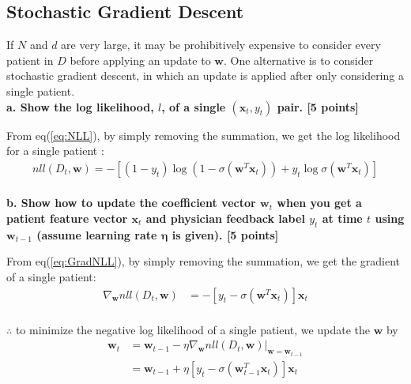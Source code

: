 \documentclass[12pt]{article}
\begin{document}
\subsection{Stochastic Gradient Descent}
If $N$ and $d$ are very large, it may be prohibitively expensive to consider every patient in $D$ before applying an update to $\mathbf{w}$. One alternative is to consider stochastic gradient descent, in which an update is applied after only considering a single patient. \\

\textbf{a. Show the log likelihood, $l$, of a single $(\mathbf{x}_t, y_t)$ pair. [5 points]}

From eq(\ref{eq:NLL}), by simply removing the summation, we get the log likelihood for a single patient :
\begin{equation}
\begin{aligned}
nll\left (D_t, \mathbf{w} \right ) = - \left [ \left ( 1 - y_t \right ) \log(1-\sigma(\mathbf{w}^T\mathbf{x}_t)) + y_t\log \sigma(\mathbf{w}^T\mathbf{x}_t)  \right ]
\end{aligned}
\label{eq:nll}
\end{equation}\\

\textbf{b. Show how to update the coefficient vector $\mathbf{w}_t$ when you get a patient feature vector $\mathbf{x}_t$ and physician feedback label $y_t$ at time $t$ using $\mathbf{w}_{t-1}$ (assume learning rate $\mathbf{\eta}$ is given). [5 points]}

From eq(\ref{eq:GradNLL}), by simply removing the summation, we get the gradient of a single patient:
\begin{equation}
\begin{aligned}
\nabla_\mathbf{w}nll\left (D_t, \mathbf{w} \right ) 
& = - \left [ 
y_t - \sigma(\mathbf{w}^T\mathbf{x}_t)
\right ]\mathbf{x}_t\\
\end{aligned} 
\end{equation}

$\therefore$ to minimize the negative log likelihood of a single patient, we update the $\mathbf{w}$ by
\begin{equation}
\begin{aligned}
\mathbf{w}_{t}
& =  \mathbf{w}_{t-1} - \eta \nabla_\mathbf{w}nll\left (D_t, \mathbf{w} \right )
\bigg|_{\mathbf{w} = \mathbf{w}_{t-1} } \\
& = \mathbf{w}_{t-1}
+ \eta \left [ 
y_t - \sigma(\mathbf{w}_{t-1}^T\mathbf{x}_t)
\right ]\mathbf{x}_t\\
\end{aligned} 
\end{equation}
\end{document}
